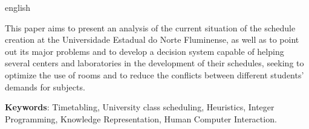 \begin{resumo}[Abstract]
    \begin{otherlanguage*}{english}

        This paper aims to present an analysis of the current situation of the schedule creation at the Universidade Estadual do Norte Fluminense, as well as to point out its major problems and to develop a decision system capable of helping several centers and laboratories in the development of their schedules, seeking to optimize the use of rooms and to reduce the conflicts between different students' demands for subjects.
        
        \vspace{\onelineskip}
        
        \textbf{Keywords}: Timetabling, University class scheduling, Heuristics, Integer Programming, Knowledge Representation, Human Computer Interaction.

    \end{otherlanguage*}
\end{resumo}